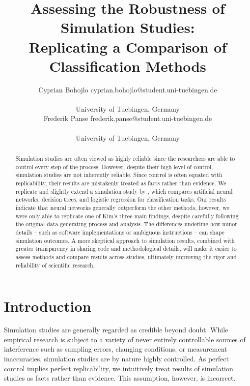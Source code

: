 \documentclass[12pt]{article}
\begin{document}
\title{Assessing the Robustness of Simulation Studies: \\ 
       Replicating a Comparison of Classification Methods}

\author{\name Cyprian Bohojlo \email cyprian.bohojlo@student.uni-tuebingen.de \\
        \\
       University of Tuebingen, Germany \\
       \AND
       \name Frederik Panse \email frederik.panse@student.uni-tuebingen.de \\
        \\
       University of Tuebingen, Germany}


\maketitle

\begin{abstract}%
Simulation studies are often viewed as highly reliable since the researchers are able to control every step of the process. However, despite their high level of control, simulation studies are not inherently reliable. Since control is often equated with replicability, their results are mistakenly treated as facts rather than evidence. We replicate and slightly extend a simulation study by \textcite{kim:10}, which compares artificial neural networks, decision trees, and logistic regression for classification tasks. Our results indicate that neural networks generally outperform the other methods, however, we were only able to replicate one of Kim’s three main findings, despite carefully following the original data generating process and analysis. The differences underline how minor details -- such as software implementations or ambiguous instructions -- can shape simulation outcomes. A more skeptical approach to simulation results, combined with greater transparency in sharing code and methodological details, will make it easier to assess methods and compare results across studies, ultimately improving the rigor and reliability of scientific research.
\end{abstract}


\section{Introduction}

Simulation studies are generally regarded as credible beyond doubt. While empirical research is subject to a variety of never entirely controllable sources of interference such as sampling errors, changing conditions, or measurement inaccuracies, simulation studies are by nature highly controlled. As perfect control implies perfect replicability, we intuitively treat results of simulation studies as facts rather than evidence. This assumption, however, is incorrect.
\end{document}
